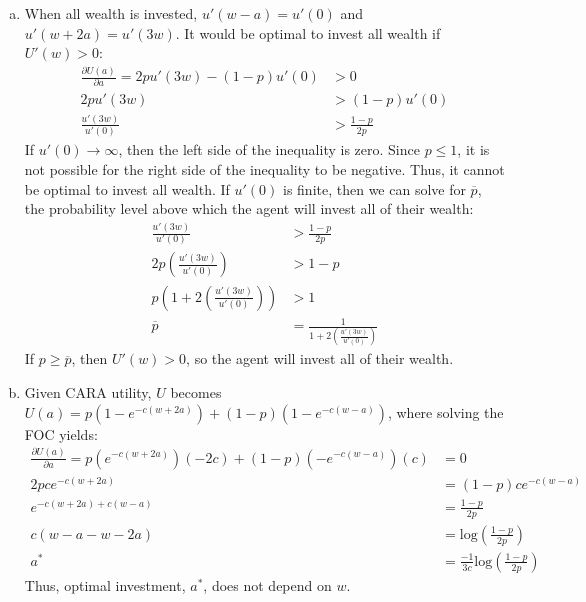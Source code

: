 \documentclass{article}
\newcommand{\loge}[1]{\text{log}\left(#1\right)}
\newcommand{\olp}{\overline{p}}
\begin{document}
\begin{enumerate}[(a)]
	\item When all wealth is invested, $u'(w-a)=u'(0)$ and $u'(w+2a)=u'(3w)$. It would be optimal to invest all wealth if $U'(w)>0$:
		\begin{align*}
			\frac{\partial U(a)}{\partial a} = 2pu'(3w) - (1-p)u'(0) &> 0	\\
				2pu'(3w)  &> (1-p)u'(0)	\\
				\frac{u'(3w)}{u'(0)} &> \frac{1-p}{2p}
		\end{align*}
		If $u'(0)\rightarrow\infty$, then the left side of the inequality is zero. Since $p\leq 1$, it is not possible for the right side of the inequality to be negative. Thus, it cannot be optimal to invest all wealth. If $u'(0)$ is finite, then we can solve for $\olp$, the probability level above which the agent will invest all of their wealth:
		\begin{align*}
			\frac{u'(3w)}{u'(0)} &> \frac{1-p}{2p}	\\
			2p\left(\frac{u'(3w)}{u'(0)}\right) &> 1-p \\
			p\left(1+ 2\left(\frac{u'(3w)}{u'(0)}\right)\right) &> 1 \\
			\olp &= \frac{1}{1+ 2\left(\frac{u'(3w)}{u'(0)}\right)}
		\end{align*}
		If $p\geq\olp$, then $U'(w)>0$, so the agent will invest all of their wealth.
		
	\item Given CARA utility, $U$ becomes ${U(a) = p\left(1-e^{-c(w+2a)}\right) + (1-p)\left(1-e^{-c(w-a)}\right)}$, where solving the FOC yields:
		\begin{align*}
			\frac{\partial U(a)}{\partial a} = p\left(e^{-c(w+2a)}\right)(-2c) + (1-p)\left(-e^{-c(w-a)}\right)(c) &= 0	\\
			2pce^{-c(w+2a)} &= (1-p)ce^{-c(w-a)}	\\
			e^{-c(w+2a) + c(w-a)} &= \frac{1-p}{2p}	\\
			c(w-a-w-2a) &= \loge{\frac{1-p}{2p}}	\\
			a^*	&= \frac{-1}{3c}\loge{\frac{1-p}{2p}}
		\end{align*}
		Thus, optimal investment, $a^*$, does not depend on $w$.
		

\end{enumerate}
\end{document}
